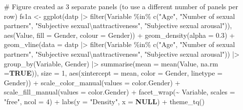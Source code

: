 \documentclass[
  bookmarksnumbered]{article}
\newenvironment{Shaded}{\begin{snugshade}}{\end{snugshade}}
\newcommand{\AttributeTok}[1]{\textcolor[rgb]{0.80,0.80,0.80}{#1}}
\newcommand{\CommentTok}[1]{\textcolor[rgb]{0.50,0.62,0.50}{#1}}
\newcommand{\ConstantTok}[1]{\textcolor[rgb]{0.86,0.64,0.64}{\textbf{#1}}}
\newcommand{\DecValTok}[1]{\textcolor[rgb]{0.86,0.86,0.80}{#1}}
\newcommand{\FloatTok}[1]{\textcolor[rgb]{0.75,0.75,0.82}{#1}}
\newcommand{\FunctionTok}[1]{\textcolor[rgb]{0.94,0.94,0.56}{#1}}
\newcommand{\NormalTok}[1]{\textcolor[rgb]{0.80,0.80,0.80}{#1}}
\newcommand{\OtherTok}[1]{\textcolor[rgb]{0.94,0.94,0.56}{#1}}
\newcommand{\SpecialCharTok}[1]{\textcolor[rgb]{0.86,0.64,0.64}{#1}}
\newcommand{\StringTok}[1]{\textcolor[rgb]{0.80,0.58,0.58}{#1}}
\begin{document}
\begin{Shaded}
\begin{Highlighting}[]
\CommentTok{\# Figure created as 3 separate panels (to use a different number of panels per row)}
\NormalTok{fs1a }\OtherTok{\textless{}{-}} \FunctionTok{ggplot}\NormalTok{(datp }\SpecialCharTok{|\textgreater{}}
                 \FunctionTok{filter}\NormalTok{(Variable }\SpecialCharTok{\%in\%} \FunctionTok{c}\NormalTok{(}\StringTok{"Age"}\NormalTok{,}
                                      \StringTok{"Number of sexual partners"}\NormalTok{,}
                                      \StringTok{"Subjective sexual}\SpecialCharTok{\textbackslash{}n}\StringTok{attractiveness"}\NormalTok{,}
                                      \StringTok{"Subjective sexual arousal"}\NormalTok{)),}
             \FunctionTok{aes}\NormalTok{(Value,}
                 \AttributeTok{fill =}\NormalTok{ Gender,}
                 \AttributeTok{colour =}\NormalTok{ Gender)) }\SpecialCharTok{+}
        \FunctionTok{geom\_density}\NormalTok{(}\AttributeTok{alpha =} \FloatTok{0.3}\NormalTok{) }\SpecialCharTok{+}
        \FunctionTok{geom\_vline}\NormalTok{(}\AttributeTok{data =}\NormalTok{ datp }\SpecialCharTok{|\textgreater{}}
                     \FunctionTok{filter}\NormalTok{(Variable }\SpecialCharTok{\%in\%} \FunctionTok{c}\NormalTok{(}\StringTok{"Age"}\NormalTok{,}
                                            \StringTok{"Number of sexual partners"}\NormalTok{,}
                                            \StringTok{"Subjective sexual}\SpecialCharTok{\textbackslash{}n}\StringTok{attractiveness"}\NormalTok{,}
                                            \StringTok{"Subjective sexual arousal"}\NormalTok{)) }\SpecialCharTok{|\textgreater{}} 
                     \FunctionTok{group\_by}\NormalTok{(Variable, Gender) }\SpecialCharTok{|\textgreater{}}
                     \FunctionTok{summarise}\NormalTok{(}\AttributeTok{mean =} \FunctionTok{mean}\NormalTok{(Value, }\AttributeTok{na.rm =}\ConstantTok{TRUE}\NormalTok{)),}
                   \AttributeTok{size =} \DecValTok{1}\NormalTok{,}
                   \FunctionTok{aes}\NormalTok{(}\AttributeTok{xintercept =}\NormalTok{ mean, }\AttributeTok{color =}\NormalTok{ Gender, }\AttributeTok{linetype =}\NormalTok{ Gender)) }\SpecialCharTok{+}
        \FunctionTok{scale\_color\_manual}\NormalTok{(}\AttributeTok{values =}\NormalTok{ color.Gender) }\SpecialCharTok{+}
        \FunctionTok{scale\_fill\_manual}\NormalTok{(}\AttributeTok{values =}\NormalTok{ color.Gender) }\SpecialCharTok{+}
        \FunctionTok{facet\_wrap}\NormalTok{(}\SpecialCharTok{\textasciitilde{}}\NormalTok{ Variable,}
                   \AttributeTok{scales =} \StringTok{"free"}\NormalTok{,}
                   \AttributeTok{ncol =} \DecValTok{4}\NormalTok{) }\SpecialCharTok{+}
        \FunctionTok{labs}\NormalTok{(}\AttributeTok{y =} \StringTok{"Density"}\NormalTok{,}
             \AttributeTok{x =} \ConstantTok{NULL}\NormalTok{) }\SpecialCharTok{+}
        \FunctionTok{theme\_tq}\NormalTok{()}


\end{Highlighting}
\end{Shaded}
\end{document}
